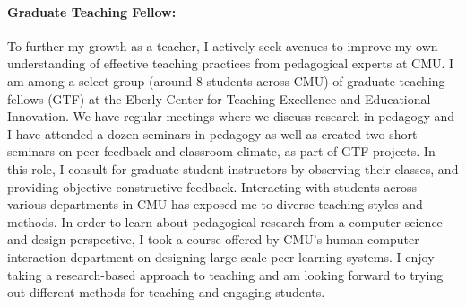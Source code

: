 \documentclass[10pt]{article}
\begin{document}
\paragraph{Graduate Teaching Fellow: }To further my growth as a teacher, I actively seek avenues to improve my own understanding of effective teaching practices from pedagogical experts at CMU. I am among a select group (around 8 students across CMU) of graduate teaching fellows (GTF) at the Eberly Center for Teaching Excellence and Educational Innovation. We have regular meetings where we discuss research in pedagogy and I have attended a dozen seminars in pedagogy as well as created two short seminars on peer feedback and classroom climate, as part of GTF projects. In this role, I consult for graduate student instructors by observing their classes, and providing objective constructive feedback. Interacting with students across various departments in CMU has exposed me to diverse teaching styles and methods. In order to learn about pedagogical research from a computer science and design perspective, I took a course offered by CMU's human computer interaction department on designing large scale peer-learning systems. %
I enjoy taking a research-based approach to teaching and am looking forward to trying out different methods for teaching and engaging students. %



%

\end{document}
